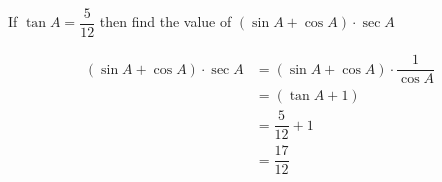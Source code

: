 
%
%
%
%
% 

\question[1] If $\tan A = \dfrac{5}{12}$ then find the value of
$(\sin A + \cos A)\cdot\sec A$

\ifprintanswers
\fi 

\begin{solution}[\halfpage]
	\begin{align}
		(\sin A + \cos A)\cdot\sec A &= (\sin A + \cos A)\cdot\dfrac{1}{\cos A} \\
		                             &= (\tan A + 1) \\
		                             &= \dfrac{5}{12} + 1 \\
		                             &= \dfrac{17}{12}
	\end{align}
\end{solution}
